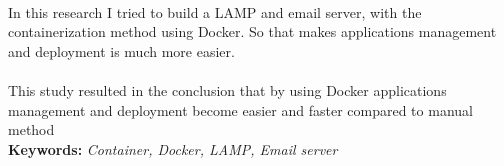 \documentclass[../../SKRIPSI_ALDZIKRI_DWIJAYANTO_PRATHAMA.tex]{subfiles}
\begin{document}
\paragraph*{} In this research I tried to build a LAMP and
email server, with the containerization method using Docker.
So that makes applications management and deployment is
much more easier.

\paragraph*{} This study resulted in the conclusion that by
using Docker applications management and deployment become
easier and faster compared to manual method\\

%
%

\noindent
\textbf{Keywords:} \textit{Container, Docker, LAMP, Email server}
\end{document}
